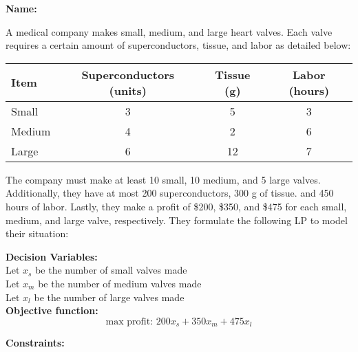 \documentclass[letterpaper,oneside,12pt]{article}%
\begin{document}
\noindent{}

\vspace{3mm} \hspace{\fill} \textbf{Name: \underline{\hspace{6cm}}}


A medical company makes small, medium, and large heart valves. Each valve requires a certain amount of superconductors, tissue, and labor as detailed below:

\begin{center}
\begin{tabular}{lccc} \hline
Item       & Superconductors (units) & Tissue (g) & Labor (hours)  \\ \hline
Small      & 3                       & 5          &  3 \\
Medium     & 4                       & 2          &  6 \\
Large      & 6                       & 12         &  7 \\
\end{tabular}
\end{center}

The company must make at least 10 small, 10 medium, and 5 large valves. Additionally, they have at most 200 superconductors, 300 g of tissue. and 450 hours of labor. Lastly, they make a profit of \$200, \$350, and \$475 for each small, medium, and large valve, respectively. They formulate the following LP to model their situation:

\textbf{Decision Variables:}\\

Let $x_s$ be the number of small valves made \\

Let $x_m$ be the number of medium valves made\\

Let $x_l$ be the number of large valves made\\

\textbf{Objective function:}\\
\[
\text{max profit: } 200 x_s + 350 x_m + 475 x_l
\]

\textbf{Constraints:}
\end{document}
